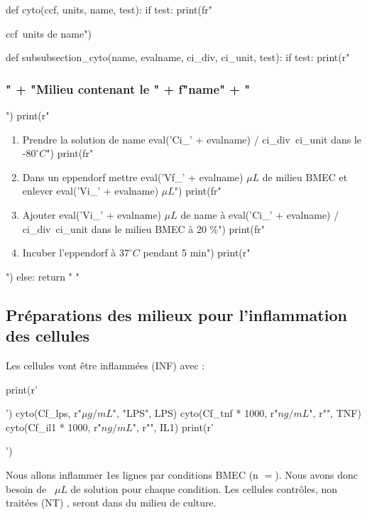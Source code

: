 \begin{pycode}

def cyto(ccf, units, name, test):
    if test:
        print(fr"\item {ccf}~{units} de {name}")
    
def subsubsection_cyto(name, evalname, ci_div, ci_unit, test):
    if test:
        print(r"\subsubsection{" + "Milieu contenant le " + f"{name}" + "}")
        print(r"\begin{enumerate}")
        print(fr"\item Prendre la solution de {name} {eval('Ci_' + evalname) / ci_div}~{ci_unit} dans le -$80^\circ C$")
        print(fr"\item Dans un eppendorf mettre {eval('Vf_' + evalname)} $\mu L$ de milieu BMEC et enlever {eval('Vi_' + evalname)} $\mu L$")
        print(fr"\item Ajouter {eval('Vi_' + evalname)} $\mu L$ de {name} à {eval('Ci_' + evalname) / ci_div}~{ci_unit} dans le milieu BMEC à 20 \%")
        print(fr"\item Incuber l'eppendorf à $37^\circ C$ pendant 5 min")
        print(r"\end{enumerate}")
    else:
        return " "

\end{pycode}


\subsection{Préparations des milieux pour l'inflammation des cellules}
\label{milieu-inflammation}

Les cellules vont être inflammées (INF)  avec :
\begin{pycode}
print(r'\begin{itemize}')
cyto(Cf_lps, r"$\mu g/mL$", "LPS", LPS)
cyto(Cf_tnf * 1000, r"$ng/mL$", r"\TNF", TNF)
cyto(Cf_il1 * 1000, r"$ng/mL$", r"\IL", IL1)
print(r'\end{itemize}')
\end{pycode}
Nous allons inflammer 1es lignes par conditions BMEC (n $=$). Nous avons donc besoin de ~$\mu L$ de solution pour chaque condition. Les cellules contrôles, non traitées (NT) , seront dans du milieu de culture. 

